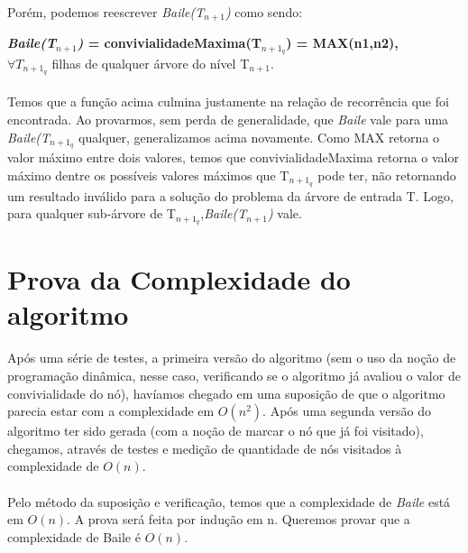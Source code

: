 \documentclass[a4paper]{article}
\begin{document}
\paragraph{}Porém, podemos reescrever \emph{Baile(T$_{n+1}$)} como sendo:
\begin{center} 
\textbf{\emph{Baile(T$_{n+1}$)} = convivialidadeMaxima(T$_{n+1_q}$) =  MAX(n1,n2),} \\$\forall T_{n+1_q}$ filhas de qualquer árvore do nível T$_{n+1}$.
\end{center}
\paragraph{}Temos que a função acima culmina justamente na relação de recorrência que foi encontrada. Ao provarmos, sem perda de generalidade, que \emph{Baile} vale para uma \emph{Baile(T$_{n+1_q}$} qualquer, generalizamos acima novamente. Como MAX retorna o valor máximo entre dois valores, temos que convivialidadeMaxima retorna o valor máximo dentre os possíveis valores máximos que T$_{n+1_q}$ pode ter, não retornando um resultado inválido para a solução do problema da árvore de entrada T. Logo, para qualquer sub-árvore de T$_{n+1_q}$,\emph{Baile(T$_{n+1}$)} vale.
\newpage

\section{Prova da Complexidade do algoritmo}
\paragraph{}Após uma série de testes, a primeira versão do algoritmo (sem o uso da noção de programação dinâmica, nesse caso, verificando se o algoritmo já avaliou o valor de convivialidade do nó), havíamos chegado em uma suposição de que o algoritmo parecia estar com a complexidade em $O(n^2)$. Após uma segunda versão do algoritmo ter sido gerada (com a noção de marcar o nó que já foi visitado), chegamos, através de testes e medição de quantidade de nós visitados à complexidade de $O(n)$.\\
\paragraph{}Pelo método da suposição e verificação, temos que a complexidade de \emph{Baile} está em $O(n)$. A prova será feita por indução em n. Queremos provar que a complexidade de Baile é $O(n)$.\\
\end{document}
